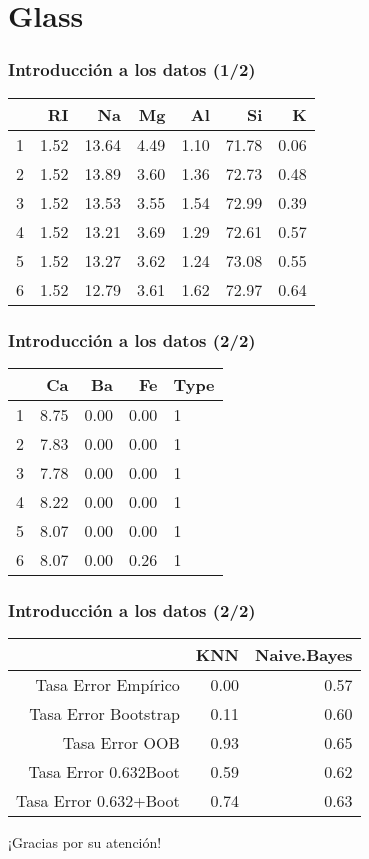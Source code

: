 \documentclass{beamer}
\theoremstyle{definition}
\begin{document}
\section{Glass}


\begin{frame}
\frametitle{Introducción a los datos (1/2)}
\begin{table}[ht]
\centering
\begin{tabular}{rrrrrrr}
  \hline
 & RI & Na & Mg & Al & Si & K \\ 
  \hline
1 & 1.52 & 13.64 & 4.49 & 1.10 & 71.78 & 0.06 \\ 
  2 & 1.52 & 13.89 & 3.60 & 1.36 & 72.73 & 0.48 \\ 
  3 & 1.52 & 13.53 & 3.55 & 1.54 & 72.99 & 0.39 \\ 
  4 & 1.52 & 13.21 & 3.69 & 1.29 & 72.61 & 0.57 \\ 
  5 & 1.52 & 13.27 & 3.62 & 1.24 & 73.08 & 0.55 \\ 
  6 & 1.52 & 12.79 & 3.61 & 1.62 & 72.97 & 0.64 \\ 
   \hline
\end{tabular}
\end{table}
\end{frame}

\begin{frame}
\frametitle{Introducción a los datos (2/2)}
\begin{table}[ht]
\centering
\begin{tabular}{rrrrl}
  \hline
 & Ca & Ba & Fe & Type \\ 
  \hline
1 & 8.75 & 0.00 & 0.00 & 1 \\ 
  2 & 7.83 & 0.00 & 0.00 & 1 \\ 
  3 & 7.78 & 0.00 & 0.00 & 1 \\ 
  4 & 8.22 & 0.00 & 0.00 & 1 \\ 
  5 & 8.07 & 0.00 & 0.00 & 1 \\ 
  6 & 8.07 & 0.00 & 0.26 & 1 \\ 
   \hline
\end{tabular}
\end{table}
\end{frame}


\begin{frame}
\frametitle{Introducción a los datos (2/2)}
\begin{table}[ht]
\centering
\begin{tabular}{rrr}
  \hline
 & KNN & Naive.Bayes \\ 
  \hline
Tasa Error Empírico & 0.00 & 0.57 \\ 
  Tasa Error Bootstrap & 0.11 & 0.60 \\ 
  Tasa Error OOB & 0.93 & 0.65 \\ 
  Tasa Error 0.632Boot & 0.59 & 0.62 \\ 
  Tasa Error 0.632+Boot & 0.74 & 0.63 \\ 
   \hline
\end{tabular}
\end{table}
\end{frame}


\begin{frame}
\begin{center}
\huge{¡Gracias por su atención!}
\end{center} 
\end{frame}
\end{document}
